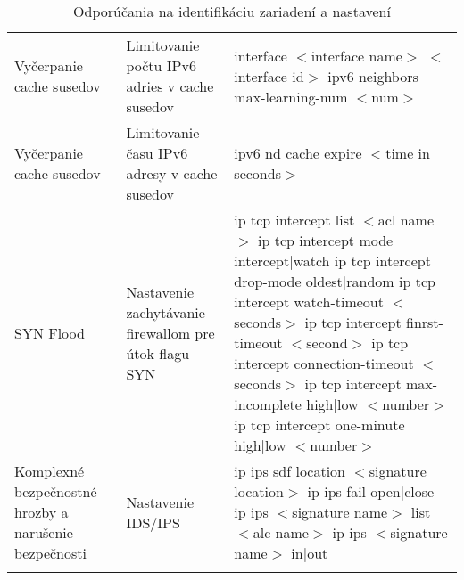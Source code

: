\begin{longtable}[!htbp]{|L{10em}L{10em}L{34em}|}
	\\
	Vyčerpanie cache susedov	&Limitovanie počtu IPv6 adries v cache susedov	&interface $<$interface name$>$ $<$interface id$>$
	ipv6 neighbors max-learning-num $<$num$>$\\
	Vyčerpanie cache susedov	&Limitovanie času IPv6 adresy v cache susedov	&ipv6 nd cache expire $<$time in seconds$>$\\
	SYN Flood 	&Nastavenie zachytávanie firewallom pre útok flagu SYN	&ip tcp intercept list $<$acl name$>$
	ip tcp intercept mode intercept|watch
	ip tcp intercept drop-mode oldest|random
	ip tcp intercept watch-timeout $<$seconds$>$
	ip tcp intercept finrst-timeout $<$second$>$
	ip tcp intercept connection-timeout $<$seconds$>$
	ip tcp intercept max-incomplete high|low $<$number$>$
	ip tcp intercept one-minute high|low $<$number$>$\\
	Komplexné bezpečnostné hrozby a narušenie bezpečnosti	&Nastavenie IDS/IPS	&ip ips sdf location $<$signature location$>$
	ip ips fail  open|close
	ip ips $<$signature name$>$ list $<$alc name$>$
	ip ips $<$signature name$>$ in|out\\
	
	
	\hline
\caption{Odporúčania na identifikáciu zariadení a nastavení}
\label{tab:cisco_table}%
\end{longtable}%
\restoregeometry
\normalsize

